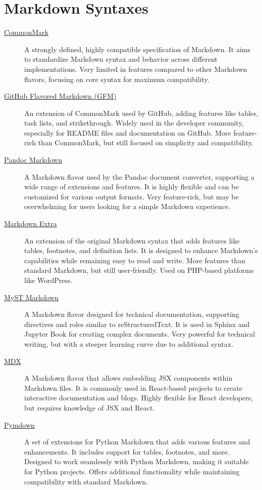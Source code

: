 \documentclass[a4paper,twoside]{article}
\begin{document}
\section{Markdown Syntaxes}
\begin{description}
\item[{\href{https://commonmark.org/}{CommonMark}}] A strongly defined, highly compatible specification of Markdown. It aims to standardize Markdown syntax and behavior across different implementations. Very limited in features compared to other Markdown flavors, focusing on core syntax for maximum compatibility.
\item[{\href{https://github.github.com/gfm/}{GitHub Flavored Markdown (GFM)}}] An extension of CommonMark used by GitHub, adding features like tables, task lists, and strikethrough. Widely used in the developer community, especially for README files and documentation on GitHub. More feature-rich than CommonMark, but still focused on simplicity and compatibility.
\item[{\href{https://pandoc.org/MANUAL.html\#pandocs-markdown}{Pandoc Markdown}}] A Markdown flavor used by the Pandoc document converter, supporting a wide range of extensions and features. It is highly flexible and can be customized for various output formats. Very feature-rich, but may be overwhelming for users looking for a simple Markdown experience.
\item[{\href{https://michelf.ca/projects/php-markdown/extra/}{Markdown Extra}}] An extension of the original Markdown syntax that adds features like tables, footnotes, and definition lists. It is designed to enhance Markdown's capabilities while remaining easy to read and write. More features than standard Markdown, but still user-friendly. Used on PHP-based platforms like WordPress.
\item[{\href{https://myst-parser.readthedocs.io/en/latest/}{MyST Markdown}}] A Markdown flavor designed for technical documentation, supporting directives and roles similar to reStructuredText. It is used in Sphinx and Jupyter Book for creating complex documents. Very powerful for technical writing, but with a steeper learning curve due to additional syntax.
\item[{\href{https://mdxjs.com/}{MDX}}] A Markdown flavor that allows embedding JSX components within Markdown files. It is commonly used in React-based projects to create interactive documentation and blogs. Highly flexible for React developers, but requires knowledge of JSX and React.
\item[{\href{https://pymdown.github.io/}{Pymdown}}] A set of extensions for Python Markdown that adds various features and enhancements. It includes support for tables, footnotes, and more. Designed to work seamlessly with Python Markdown, making it suitable for Python projects. Offers additional functionality while maintaining compatibility with standard Markdown.
\end{description}
\end{document}
